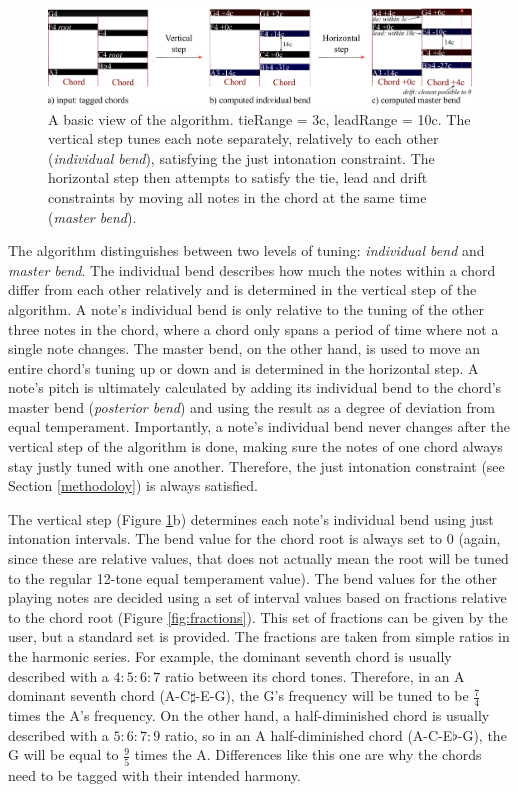\documentclass[a4paper]{article}
\begin{document}
\begin{figure}
	\includegraphics[width=\linewidth]{Figures/algo_outline.pdf}
	\caption{A basic view of the algorithm. tieRange = 3c, leadRange = 10c. The vertical step tunes each note separately, relatively to each other (\textit{individual bend}), satisfying the just intonation constraint. The horizontal step then attempts to satisfy the tie, lead and drift constraints by moving all notes in the chord at the same time (\textit{master bend}).}
	\label{fig:algo_outline}
\end{figure}

The algorithm distinguishes between two levels of tuning: \textit{individual bend} and \textit{master bend}. The individual bend describes how much the notes within a chord differ from each other relatively and is determined in the vertical step of the algorithm. A note's individual bend is only relative to the tuning of the other three notes in the chord, where a chord only spans a period of time where not a single note changes. The master bend, on the other hand, is used to move an entire chord's tuning up or down and is determined in the horizontal step. A note's pitch is ultimately calculated by adding its individual bend to the chord's master bend (\textit{posterior bend}) and using the result as a degree of deviation from equal temperament. Importantly, a note's individual bend never changes after the vertical step of the algorithm is done, making sure the notes of one chord always stay justly tuned with one another. Therefore, the just intonation constraint (see Section \ref{methodoloy}) is always satisfied.

The vertical step (Figure \ref{fig:algo_outline}b) determines each note's individual bend using just intonation intervals. The bend value for the chord root is always set to 0 (again, since these are relative values, that does not actually mean the root will be tuned to the regular 12-tone equal temperament value). The bend values for the other playing notes are decided using a set of interval values based on fractions relative to the chord root (Figure \ref{fig:fractions}). This set of fractions can be given by the user, but a standard set is provided. The fractions are taken from simple ratios in the harmonic series. For example, the dominant seventh chord is usually described with a $4:5:6:7$ ratio between its chord tones. Therefore, in an A dominant seventh chord (A-C$\sharp$-E-G), the G's frequency will be tuned to be $\frac74$ times the A's frequency. On the other hand, a half-diminished chord is usually described with a $5:6:7:9$ ratio, so in an A half-diminished chord (A-C-E$\flat$-G), the G will be equal to $\frac95$ times the A. Differences like this one are why the chords need to be tagged with their intended harmony.
\end{document}
